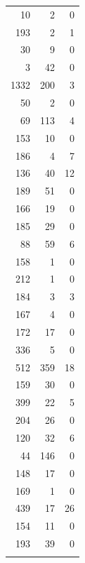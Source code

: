 \documentclass[nojss]{jss}
\begin{document}
\begin{longtable}{rrr}
   10 &   2 &   0 \\ 
  193 &   2 &   1 \\ 
   30 &   9 &   0 \\ 
    3 &  42 &   0 \\ 
  1332 & 200 &   3 \\ 
   50 &   2 &   0 \\ 
   69 & 113 &   4 \\ 
  153 &  10 &   0 \\ 
  186 &   4 &   7 \\ 
  136 &  40 &  12 \\ 
  189 &  51 &   0 \\ 
  166 &  19 &   0 \\ 
  185 &  29 &   0 \\ 
   88 &  59 &   6 \\ 
  158 &   1 &   0 \\ 
  212 &   1 &   0 \\ 
  184 &   3 &   3 \\ 
  167 &   4 &   0 \\ 
  172 &  17 &   0 \\ 
  336 &   5 &   0 \\ 
  512 & 359 &  18 \\ 
  159 &  30 &   0 \\ 
  399 &  22 &   5 \\ 
  204 &  26 &   0 \\ 
  120 &  32 &   6 \\ 
   44 & 146 &   0 \\ 
  148 &  17 &   0 \\ 
  169 &   1 &   0 \\ 
  439 &  17 &  26 \\ 
  154 &  11 &   0 \\ 
  193 &  39 &   0 \\ 
   \hline
\hline
\label{ppxtab}
\end{longtable}
\end{document}
